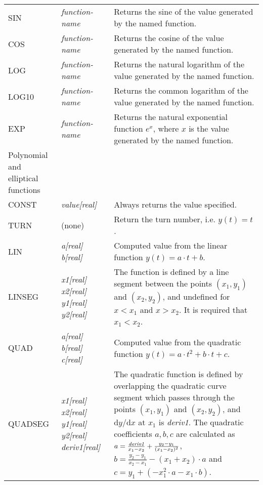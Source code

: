 \documentclass[a4paper,11pt]{report}
\begin{document}
\begin{center}
\begin{longtable}{|p{2.25cm} | p{4cm} p{9.5cm}|}
  SIN        & \emph{function-name} & 
  Returns the sine of the value generated by the named function. \\*
  
  COS        & \emph{function-name} &
  Returns the cosine of the value generated by the named function. \\*
  
  LOG        & \emph{function-name} &
  Returns the natural logarithm of the value generated by the named function. \\*
  
  LOG10      & \emph{function-name} &
  Returns the common logarithm of the value generated by the named function. \\*
  
  EXP        & \emph{function-name} &
  Returns the natural exponential function $e^x$, where $x$ is the value generated by the named function. \\
  
  \hline
  \rowcolor{blue!15}
  Polynomial and elliptical functions &  & \\*

  CONST       & \emph{value[real]} & 
  Always returns the value specified.\\*

  TURN        & (none) & 
  Return the turn number, i.e. $y(t) = t$.\\*

  LIN         & \emph{a[real] b[real]} & 
  Computed value from the linear function $y(t) = a\cdot t + b$. \\*

  LINSEG      & \emph{x1[real] x2[real] y1[real] y2[real]} & 
  The function is defined by a line segment between the points $(x_1,y_1)$ and $(x_2,y_2)$, and undefined for $x < x_1$ and $x>x_2$. 
  It is required that $x_1 < x_2$.\\*

  QUAD        & \emph{a[real] b[real] c[real]} & 
  Computed value from the quadratic function $y(t) = a\cdot t^2 + b\cdot t + c$. \\*

  QUADSEG     & \emph{x1[real] x2[real] y1[real] y2[real] deriv1[real]} & 
  The quadratic function is defined by overlapping the quadratic curve segment which passes through the points $(x_1,y_1)$ and $(x_2,y_2)$, and $\mathrm{d}y/\mathrm{d}x$ at $x_1$ is \emph{deriv1}. 
  The quadratic coefficients $a,b,c$ are calculated as $a = \frac{\emph{deriv1}}{x_1-x_2} + \frac{y_2-y_1}{(x_1-x_2)^2}$, $b=\frac{y_2-y_1}{x_2-x_1} - (x_1+x_2)\cdot a$ and $c = y_1 + \left(- x_1^2 \cdot a - x_1 \cdot b \right)$.\\


\end{longtable}
\end{center}
\end{document}
